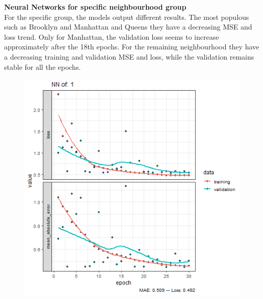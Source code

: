 \documentclass{FR16}
\begin{document}
\newpage
\noindent \textbf{Neural Networks for specific neighbourhood group}\\
For the specific group, the models output different results. The most populous such as Brooklyn and Manhattan and Queens they have a decreasing MSE and loss trend. Only for Manhattan, the validation loss seems to increase approximately after the 18th epochs. For the remaining neighbourhood they have a decreasing training and validation MSE and loss, while the validation remains stable for all the epochs.
\begin{figure}[!htb]
   \begin{minipage}{0.33\textwidth}
     \centering
     \includegraphics[width=1\linewidth]{figures/NN-1.png} 
   \end{minipage}\hfill
   \begin{minipage}{0.33\textwidth}
     \centering

\end{minipage}
\end{figure}
\end{document}
